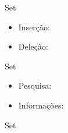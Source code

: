 \begin{frame}[fragile]{Set}

    \begin{itemize}
        \item Inserção:
        \item Deleção:
    \end{itemize}

\end{frame}

\begin{frame}[fragile]{Set}

    \begin{itemize}
        \item Pesquisa:
        \item Informações:
    \end{itemize}

\end{frame}

\begin{frame}[fragile]{Set}


\end{frame}
